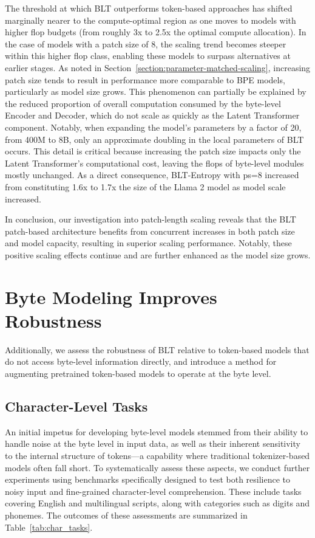 The threshold at which {\textsc BLT} outperforms token-based approaches has shifted marginally nearer to the compute-optimal region as one moves to models with higher flop budgets (from roughly 3x to 2.5x the optimal compute allocation). In the case of models with a patch size of 8, the scaling trend becomes steeper within this higher flop class, enabling these models to surpass alternatives at earlier stages. As noted in Section~\ref{section:parameter-matched-scaling}, increasing patch size tends to result in performance more comparable to BPE models, particularly as model size grows. This phenomenon can partially be explained by the reduced proportion of overall computation consumed by the byte-level Encoder and Decoder, which do not scale as quickly as the Latent Transformer component. Notably, when expanding the model’s parameters by a factor of 20, from 400M to 8B, only an approximate doubling in the local parameters of {\textsc BLT} occurs. This detail is critical because increasing the patch size impacts only the Latent Transformer’s computational cost, leaving the flops of byte-level modules mostly unchanged. As a direct consequence, {\textsc BLT}-Entropy with ps=8 increased from constituting 1.6x to 1.7x the size of the Llama 2 model as model scale increased.

In conclusion, our investigation into patch-length scaling reveals that the {\textsc BLT} patch-based architecture benefits from concurrent increases in both patch size and model capacity, resulting in superior scaling performance. Notably, these positive scaling effects continue and are further enhanced as the model size grows.

\section{Byte Modeling Improves Robustness} Additionally, we assess the robustness of {\textsc BLT} relative to token-based models that do not access byte-level information directly, and introduce a method for augmenting pretrained token-based models to operate at the byte level.
\label{sec:robustness}

\subsection{Character-Level Tasks}

An initial impetus for developing byte-level models stemmed from their ability to handle noise at the byte level in input data, as well as their inherent sensitivity to the internal structure of tokens—a capability where traditional tokenizer-based models often fall short. To systematically assess these aspects, we conduct further experiments using benchmarks specifically designed to test both resilience to noisy input and fine-grained character-level comprehension. These include tasks covering English and multilingual scripts, along with categories such as digits and phonemes. The outcomes of these assessments are summarized in Table~\ref{tab:char_tasks}.

